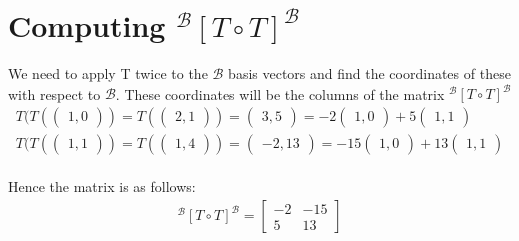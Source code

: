 \documentclass[reqno,a4paper,12pt]{amsart}
\newcommand{\B}{\mathscr{B}}
\numberwithin{equation}{section}
\begin{document}
\section{Computing $^\B[T \circ T]^\B$}
We need to apply T twice to the $\B$ basis vectors and find the coordinates of these with respect to $\B$. These coordinates will be the columns of the matrix $^\B[T \circ T]^\B$\\
  \begin{align}
    T(
    T(
    \begin{pmatrix}
    1,0
    \end{pmatrix}
    )
    =
    T(
    \begin{pmatrix}
    2,1
    \end{pmatrix}
    )
    =
    \begin{pmatrix}
    3,5
    \end{pmatrix}
    =
    -2
    \begin{pmatrix} 
    1, 0
    \end{pmatrix}
    +
    5
    \begin{pmatrix}
    1, 1
    \end{pmatrix} \label{eq:2.1}\\
    T(
    T(
    \begin{pmatrix}
    1,1
    \end{pmatrix}
    )
    =
    T(
    \begin{pmatrix}
    1,4
    \end{pmatrix}
    )
    =
    \begin{pmatrix}
    -2,13
    \end{pmatrix}
    =
    -15
    \begin{pmatrix} 
    1, 0
    \end{pmatrix}
    +
    13
    \begin{pmatrix}
    1, 1
    \end{pmatrix} \label{eq: 2.2}
  \end{align}\\
Hence the matrix is as follows:\\
  \begin{align}
    ^\B[T \circ T]^\B
    =
    \begin{bmatrix}
    -2  &  -15 \\
    5  &  13
    \end{bmatrix} \label{eq: 2.3}
  \end{align}\\
  
\end{document}
